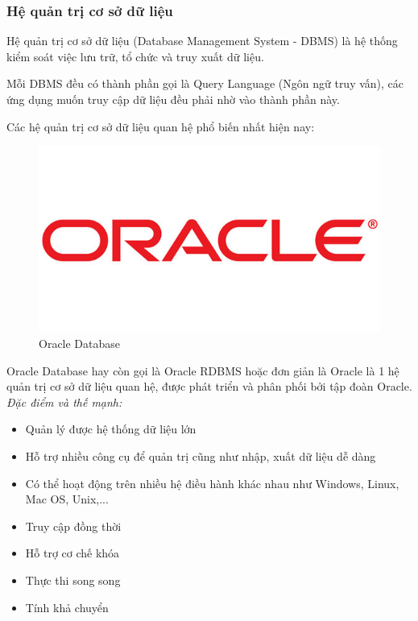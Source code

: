 \subsubsection{Hệ quản trị cơ sở dữ liệu}

Hệ quản trị cơ sở dữ liệu (Database Management System - DBMS) là hệ thống kiểm soát việc lưu trữ, tổ chức và truy xuất dữ liệu.

Mỗi DBMS đều có thành phần gọi là Query Language (Ngôn ngữ truy vấn), các ứng dụng muốn truy cập dữ liệu đều phải nhờ vào thành phần này.

Các hệ quản trị cơ sở dữ liệu quan hệ phổ biến nhất hiện nay:
\begin{figure}[!h]
    \centering
    \includegraphics[scale=0.4]{img/oracle.jpg}
    \caption{Oracle Database}
\end{figure}

Oracle Database hay còn gọi là Oracle RDBMS hoặc đơn giản là Oracle là 1 hệ quản trị cơ sở dữ liệu quan hệ, được phát triển và phân phối bởi tập đoàn Oracle.\\

\textit{Đặc điểm và thế mạnh:}
\begin{itemize}
    \item Quản lý được hệ thống dữ liệu lớn
    \item Hỗ trợ nhiều công cụ để quản trị cũng như nhập, xuất dữ liệu dễ dàng
    \item Có thể hoạt động trên nhiều hệ điều hành khác nhau như Windows, Linux, Mac OS, Unix,...
    \item Truy cập đồng thời
    \item Hỗ trợ cơ chế khóa
    \item Thực thi song song
    \item Tính khả chuyển
\end{itemize}

